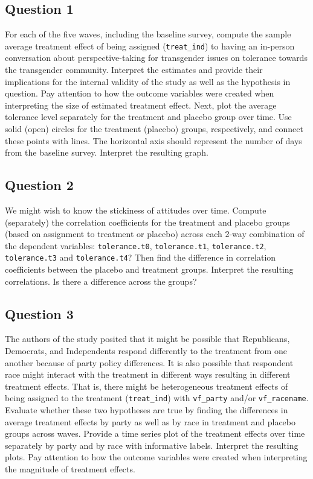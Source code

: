 \documentclass[]{article}
\begin{document}
\subsection{Question 1}\label{question-1}

For each of the five waves, including the baseline survey, compute the
sample average treatment effect of being assigned (\texttt{treat\_ind})
to having an in-person conversation about perspective-taking for
transgender issues on tolerance towards the transgender community.
Interpret the estimates and provide their implications for the internal
validity of the study as well as the hypothesis in question. Pay
attention to how the outcome variables were created when interpreting
the size of estimated treatment effect. Next, plot the average tolerance
level separately for the treatment and placebo group over time. Use
solid (open) circles for the treatment (placebo) groups, respectively,
and connect these points with lines. The horizontal axis should
represent the number of days from the baseline survey. Interpret the
resulting graph.

\subsection{Question 2}\label{question-2}

We might wish to know the stickiness of attitudes over time. Compute
(separately) the correlation coefficients for the treatment and placebo
groups (based on assignment to treatment or placebo) across each 2-way
combination of the dependent variables: \texttt{tolerance.t0},
\texttt{tolerance.t1}, \texttt{tolerance.t2}, \texttt{tolerance.t3} and
\texttt{tolerance.t4}? Then find the difference in correlation
coefficients between the placebo and treatment groups. Interpret the
resulting correlations. Is there a difference across the groups?

\subsection{Question 3}\label{question-3}

The authors of the study posited that it might be possible that
Republicans, Democrats, and Independents respond differently to the
treatment from one another because of party policy differences. It is
also possible that respondent race might interact with the treatment in
different ways resulting in different treatment effects. That is, there
might be heterogeneous treatment effects of being assigned to the
treatment (\texttt{treat\_ind}) with \texttt{vf\_party} and/or
\texttt{vf\_racename}. Evaluate whether these two hypotheses are true by
finding the differences in average treatment effects by party as well as
by race in treatment and placebo groups across waves. Provide a time
series plot of the treatment effects over time separately by party and
by race with informative labels. Interpret the resulting plots. Pay
attention to how the outcome variables were created when interpreting
the magnitude of treatment effects.
\end{document}
